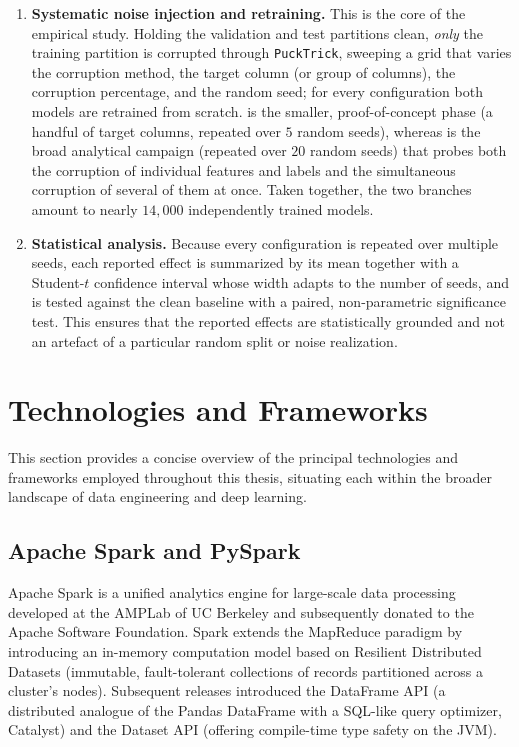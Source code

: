 \documentclass[../main.tex]{subfiles}
\begin{document}
\begin{enumerate}
    \item \textbf{Systematic noise injection and retraining.} This is the core of the empirical study. Holding the validation and test partitions clean, \emph{only} the training partition is corrupted through \texttt{PuckTrick}, sweeping a grid that varies the corruption method, the target column (or group of columns), the corruption percentage, and the random seed; for every configuration both models are retrained from scratch.  is the smaller, proof-of-concept phase (a handful of target columns, repeated over $5$ random seeds), whereas  is the broad analytical campaign (repeated over $20$ random seeds) that probes both the corruption of individual features and labels and the simultaneous corruption of several of them at once. Taken together, the two branches amount to nearly $14{,}000$ independently trained models.

    \item \textbf{Statistical analysis.} Because every configuration is repeated over multiple seeds, each reported effect is summarized by its mean together with a Student-$t$ confidence interval whose width adapts to the number of seeds, and is tested against the clean baseline with a paired, non-parametric significance test. This ensures that the reported effects are statistically grounded and not an artefact of a particular random split or noise realization.
\end{enumerate}


\newpage
\section{Technologies and Frameworks}
\label{sec:technologies}

This section provides a concise overview of the principal technologies and frameworks employed throughout this thesis, situating each within the broader landscape of data engineering and deep learning.

\subsection{Apache Spark and PySpark}
\label{sec:tech-spark}

Apache Spark\supercite{apache_spark} is a unified analytics engine for large-scale data processing developed at the AMPLab of UC Berkeley and subsequently donated to the Apache Software Foundation.  Spark extends the MapReduce paradigm by introducing an in-memory computation model based on Resilient Distributed Datasets (immutable, fault-tolerant collections of records partitioned across a cluster's nodes).  Subsequent releases introduced the DataFrame API (a distributed analogue of the Pandas DataFrame with a SQL-like query optimizer, Catalyst) and the Dataset API (offering compile-time type safety on the JVM).
\end{document}
